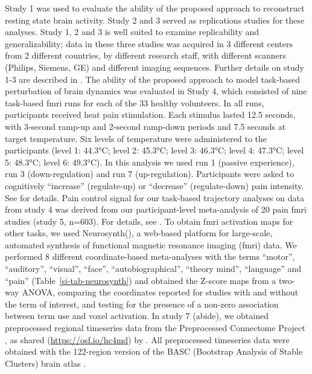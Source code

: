 \documentclass{article}
\begin{document}
Study 1 was used to evaluate the ability of the proposed approach to reconstruct resting state brain activity. Study 2 and 3 served as replications studies for these analyses. Study 1, 2 and 3 is well suited to examine replicability and generalizability; data in these three studies was acquired in 3 different centers from 2 different countries, by different research staff, with different scanners (Philips, Siemens, GE) and different imaging sequences. Further details on study 1-3 are described in \cite{Spisak_2020}. The ability of the proposed approach to model task-based perturbation of brain dynamics was evaluated in Study 4, which consisted of nine task-based \acrshort{fmri} runs for each of the 33 healthy volunteers. In all runs, participants received heat pain stimulation. Each stimulus lasted 12.5 seconds, with 3-second ramp-up and 2-second ramp-down periods and 7.5 seconds at target temperature. Six levels of temperature were a\acrshort{dm}inistered to the participants (level 1: 44.3°C; level 2: 45.3°C; level 3: 46.3°C; level 4: 47.3°C; level 5: 48.3°C; level 6: 49.3°C). In this analysis we used run 1 (passive experience),  run 3 (down-regulation) and run 7 (up-regulation). Participants were asked to cognitively ``increase'' (regulate-up) or ``decrease'' (regulate-down) pain intensity. See \citet{woo2015distinct} for details.
Pain control signal for our task-based trajectory analyses on data from study 4 was derived from our participant-level meta-analysis of 20 pain \acrshort{fmri} studies (study 5, n=603). For details, see \citet{zunhammer2021meta}.
To obtain \acrshort{fmri} activation maps for other tasks, we used Neurosynth(\cite{Tor_D__2011}), a web-based platform for large-scale, automated synthesis of functional magnetic resonance imaging (\acrshort{fmri}) data. We performed 8 different coordinate-based meta-analyses with the terms ``motor'', ``auditory'', ``visual'', ``face'', ``autobiographical'', ``theory mind'', ``language'' and ``pain'' (Table~\ref{si-tab-neurosynth}) and obtained the Z-score maps from a two-way ANOVA, comparing the coordinates reported for studies with and without the term of interest, and testing for the presence of a non-zero association between term use and voxel activation.
In study 7 (\acrshort{abide}), we obtained preprocessed regional timeseries data from the Preprocessed Connectome Project \citep{craddock2013towards}, as shared (\href{https://osf.io/hc4md}{https://osf.io/hc4md}) by \citet{dadi2019benchmarking}. All preprocessed timeseries data were obtained with the 122-region version of the BASC (Bootstrap Analysis of Stable Clusters) brain atlas \citep{bellec2010multi}.
\end{document}
